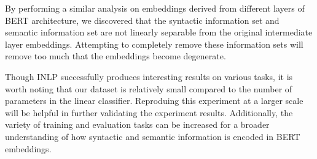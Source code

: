 \documentclass[11pt,a4paper]{article}
\begin{document}
By performing a similar analysis on embeddings derived from different layers of BERT architecture, we discovered that the syntactic information set and semantic information set are not linearly separable from the original intermediate layer embeddings. Attempting to completely remove these information sets will remove too much that the embeddings become degenerate.


Though INLP successfully produces interesting results on various tasks, it is worth noting that our dataset is relatively small compared to the number of parameters in the linear classifier. Reproduing this experiment at a larger scale will be helpful in further validating the experiment results. Additionally, the variety of training and evaluation tasks can be increased for a broader understanding of how syntactic and semantic information is encoded in BERT embeddings.


















\end{document}
